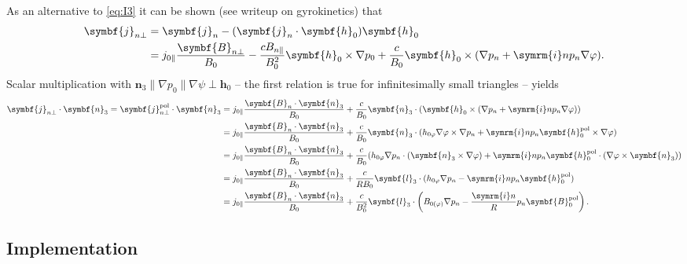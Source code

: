 \documentclass[a4paper, 10pt, english]{article}
\let\temp\vartheta
\let\vartheta\theta
\let\theta\temp
\let\temp\varphi
\let\varphi\phi
\let\phi\temp
\let\vec\symbf
\newcommand*\im{\ensuremath{\symrm{i}}}
\newcommand*\pol{\ensuremath{\textrm{pol}}}
\begin{document}
As an alternative to \cref{eq:I3} it can be shown (see writeup on gyrokinetics) that
\begin{align}
  \vec{j}_{n \perp} &= \vec{j}_{n} - (\vec{j}_{n} \cdot \vec{h}_{0}) \vec{h}_{0} \nonumber \\
  &= j_{0 \parallel} \frac{\vec{B}_{n \perp}}{B_{0}} - \frac{c B_{n \parallel}}{B_{0}^{2}} \vec{h}_{0} \times \nabla p_{0} + \frac{c}{B_{0}} \vec{h}_{0} \times (\nabla p_{n} + \im n p_{n} \nabla \phi).
\end{align}
Scalar multiplication with $\vec{n}_{3} \parallel \nabla p_{0} \parallel \nabla \psi \perp \vec{h}_{0}$ -- the first relation is true for infinitesimally small triangles -- yields
\begin{align}
  \vec{j}_{n \perp} \cdot \vec{n}_{3} = \vec{j}_{n \perp}^{\pol} \cdot \vec{n}_{3} &= j_{0 \parallel} \frac{\vec{B}_{n} \cdot \vec{n}_{3}}{B_{0}} + \frac{c}{B_{0}} \vec{n}_{3} \cdot (\vec{h}_{0} \times (\nabla p_{n} + \im n p_{n} \nabla \phi)) \nonumber \\
  &= j_{0 \parallel} \frac{\vec{B}_{n} \cdot \vec{n}_{3}}{B_{0}} + \frac{c}{B_{0}} \vec{n}_{3} \cdot (h_{0 \phi} \nabla \phi \times \nabla p_{n} + \im n p_{n} \vec{h}_{0}^{\pol} \times \nabla \phi) \nonumber \\
  &= j_{0 \parallel} \frac{\vec{B}_{n} \cdot \vec{n}_{3}}{B_{0}} + \frac{c}{B_{0}} (h_{0 \phi} \nabla p_{n} \cdot (\vec{n}_{3} \times \nabla \phi) + \im n p_{n} \vec{h}_{0}^{\pol} \cdot (\nabla \phi \times \vec{n}_{3})) \nonumber \\
  &= j_{0 \parallel} \frac{\vec{B}_{n} \cdot \vec{n}_{3}}{B_{0}} + \frac{c}{R B_{0}} \vec{l}_{3} \cdot (h_{0 \phi} \nabla p_{n} - \im n p_{n} \vec{h}_{0}^{\pol}) \nonumber \\
  &= j_{0 \parallel} \frac{\vec{B}_{n} \cdot \vec{n}_{3}}{B_{0}} + \frac{c}{B_{0}^{2}} \vec{l}_{3} \cdot \left( B_{0 (\phi)} \nabla p_{n} - \frac{\im n}{R} p_{n} \vec{B}_{0}^{\pol} \right). \label{eq:I3_alt}
\end{align}

\subsection{Implementation}
\end{document}
